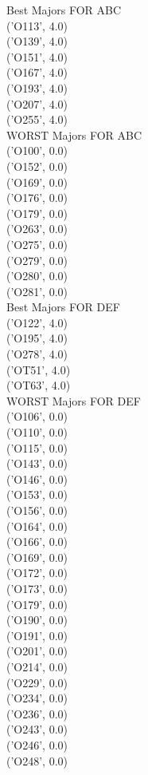 Best Majors FOR ABC \\
('O113', 4.0) \\
('O139', 4.0) \\
('O151', 4.0) \\
('O167', 4.0) \\
('O193', 4.0) \\
('O207', 4.0) \\
('O255', 4.0) \\
WORST Majors FOR ABC \\
('O100', 0.0) \\
('O152', 0.0) \\
('O169', 0.0) \\
('O176', 0.0) \\
('O179', 0.0) \\
('O263', 0.0) \\
('O275', 0.0) \\
('O279', 0.0) \\
('O280', 0.0) \\
('O281', 0.0) \\
Best Majors FOR DEF \\
('O122', 4.0) \\
('O195', 4.0) \\
('O278', 4.0) \\
('OT51', 4.0) \\
('OT63', 4.0) \\
WORST Majors FOR DEF \\
('O106', 0.0) \\
('O110', 0.0) \\
('O115', 0.0) \\
('O143', 0.0) \\
('O146', 0.0) \\
('O153', 0.0) \\
('O156', 0.0) \\
('O164', 0.0) \\
('O166', 0.0) \\
('O169', 0.0) \\
('O172', 0.0) \\
('O173', 0.0) \\
('O179', 0.0) \\
('O190', 0.0) \\
('O191', 0.0) \\
('O201', 0.0) \\
('O214', 0.0) \\
('O229', 0.0) \\
('O234', 0.0) \\
('O236', 0.0) \\
('O243', 0.0) \\
('O246', 0.0) \\
('O248', 0.0) \\
